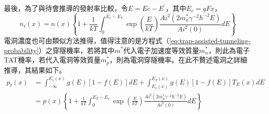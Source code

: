 最後，為了與待會推導的發射率比較，令$E=Ec-E^\prime$，其中$E_c=qFx$，
\begin{equation}
\label{eq:nt-n-relationship}
n_t(x)=n(x)\left\{1+\frac{1}{kT}\int_0^{E_c-E_T}\exp\left(\frac{E}{kT}\right)\frac{Ai^2(2m_n^*\gamma^{-2}\hbar^{-2}E)}{Ai^2(0)}dE\right\}
\end{equation}
\hspace{2em}電洞濃度也可由類似方法推得，值得注意的是方程式（\ref{eq:trap-assisted-tunneling-probability}）之穿隧機率，若將其中$m^*$代入電子加速度等效質量$m_n^*$，則此為電子TAT機率，若代入電洞等效質量$m_p^*$，則為電洞穿隧機率。在此不贅述電洞之詳細推導，其結果如下。
\begin{equation}
\begin{aligned}
p_t(x)&=\int_{-\infty}^{E_v(x)}g(E)\left[1-f(E)\right]dE+\int_{E_v(x)}^{E_T(x)}g(E)\left[1-f(E)\right]T_E(x)dE\\[5pt]
&=p(x)\left\{1+\frac{1}{kT}\int_0^{E_T-E_v}\exp\left(\frac{E}{kT}\right)\frac{Ai^2(2m_p^*\gamma^{-2}\hbar^{-2}E)}{Ai^2(0)}dE\right\}
\end{aligned}
\end{equation}

